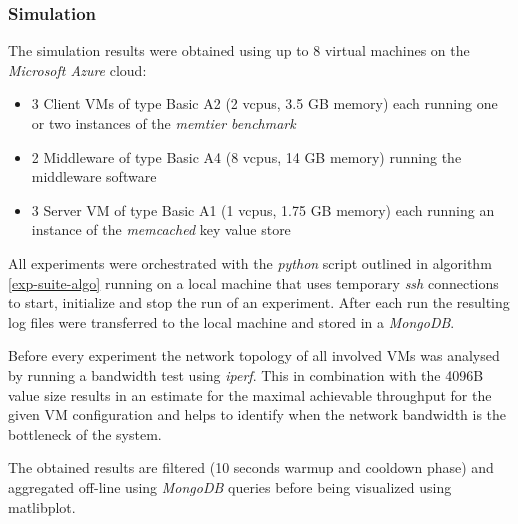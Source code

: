 \documentclass[11pt,a4paper]{article}
\begin{document}
\subsubsection{Simulation}\label{simulation}

The simulation results were obtained using up to 8 virtual machines on the \emph{Microsoft Azure} cloud:
\begin{itemize}
	\item 3 Client VMs of type Basic A2 (2 vcpus, 3.5 GB memory) each running one or two instances of the \emph{memtier benchmark}
	\item 2 Middleware of type Basic A4 (8 vcpus, 14 GB memory) running the middleware software
	\item 3 Server VM of type Basic A1 (1 vcpus, 1.75 GB memory) each running an instance of the \emph{memcached} key value store
\end{itemize}

All experiments were orchestrated with the \emph{python} script outlined in algorithm \ref{exp-suite-algo} running on a local machine that uses temporary \emph{ssh} connections to start, initialize and stop the run of an experiment. After each run  the resulting log files were transferred to the local machine and stored in a \emph{MongoDB}.
 
Before every experiment the network topology of all involved VMs was analysed by running a bandwidth test using \emph{iperf}. This in combination with the 4096B value size results in an estimate for the maximal achievable throughput for the given VM configuration and helps to identify when the network bandwidth is the bottleneck of the system.

The obtained results are filtered (10 seconds warmup and cooldown phase) and aggregated off-line using \emph{MongoDB} queries before being visualized using matlibplot.
\end{document}
